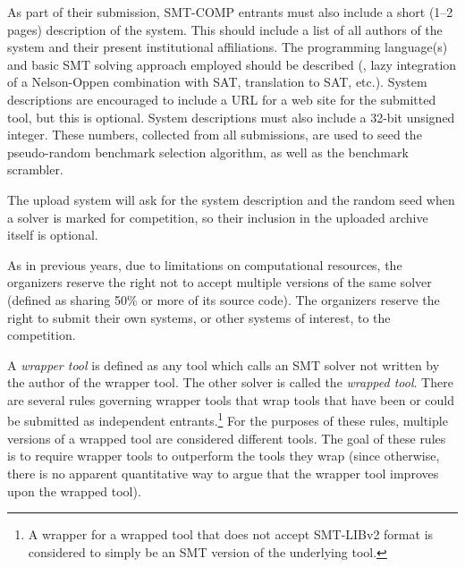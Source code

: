 \documentclass[12pt]{article}
\begin{document}
As part of their submission,
SMT-COMP entrants must also include a short (1--2 pages) description of
the system.  This should include a list of all authors of the system
and their present institutional affiliations.  The programming
language(s) and basic SMT solving approach employed should be
described (\eg, lazy integration of a Nelson-Oppen combination with
SAT, translation to SAT, etc.).  System descriptions are encouraged to
include a URL for a web site for the submitted tool, but this is
optional.  System descriptions must also include a 32-bit unsigned
integer.  These numbers, collected from all submissions, are used
to seed the pseudo-random benchmark selection algorithm, as well
as the benchmark scrambler.

The upload system will ask for the system description and
the random seed when a solver is marked for competition, so
their inclusion in the uploaded archive itself is optional.

As in previous years, due to limitations on
computational resources, the organizers reserve the right not to
accept multiple versions of the same solver (defined as sharing 50\%
or more of its source code).  The organizers reserve the right to
submit their own systems, or other systems of interest, to the
competition.

A \emph{wrapper tool} is defined as any tool
which calls an SMT solver not written by the author of the wrapper
tool.  The other solver is called the \emph{wrapped tool}.  There are
several rules governing wrapper tools that wrap tools that have been or could be submitted as independent entrants.\footnote{A wrapper
for a wrapped tool that does not accept SMT-LIBv2 format is considered to simply be an SMT version of the underlying tool.}
For the purposes of these rules,
multiple versions of a wrapped tool are considered different tools.
The goal of these rules is to require wrapper tools to outperform the
tools they wrap (since otherwise, there is no apparent quantitative
way to argue that the wrapper tool improves upon the wrapped tool).
\end{document}
